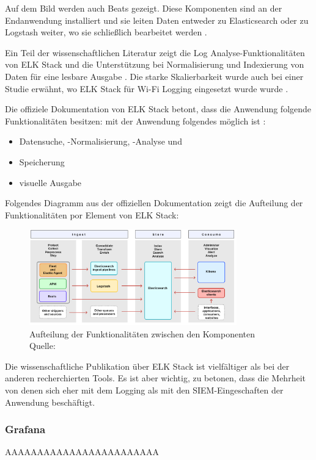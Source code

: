 Auf dem Bild werden auch Beats gezeigt. Diese Komponenten sind an der Endanwendung installiert und sie leiten Daten entweder zu Elasticsearch oder zu Logstash weiter, wo sie schließlich bearbeitet werden \citep{Jain_LMELK}. 

Ein Teil der wissenschaftlichen Literatur zeigt die Log Analyse-Funktionalitäten von ELK Stack und die Unterstützung bei Normalisierung und Indexierung von Daten für eine lesbare Ausgabe \citep{Advani_elkstakc}. Die starke Skalierbarkeit wurde auch bei einer Studie erwähnt, wo ELK Stack für Wi-Fi Logging eingesetzt wurde wurde \citep{Wang_elkwifi}.

Die offiziele Dokumentation von ELK Stack betont, dass die Anwendung folgende Funktionalitäten besitzen:  mit der Anwendung folgendes möglich ist \citep{elastic_docs}:

\begin{itemize}[noitemsep]
   \item Datensuche, -Normalisierung, -Analyse und 
   \item Speicherung
   \item visuelle Ausgabe
\end{itemize}

Folgendes Diagramm aus der offiziellen Dokumentation zeigt die Aufteilung der Funktionalitäten por Element von ELK Stack:

\begin{figure}[H]
   \centering
   \includegraphics[width=0.8\textwidth]{assets/2_p9.png}
   \caption{Aufteilung der Funktionalitäten zwischen den Komponenten\\Quelle: \citep{elastic_docs}}
   \centering
\end{figure}

Die wissenschaftliche Publikation über ELK Stack ist vielfältiger als bei der anderen recherchierten Tools. Es ist aber wichtig, zu betonen, dass die Mehrheit von denen sich eher mit dem Logging als mit den \gls{SIEM}-Eingeschaften der Anwendung beschäftigt.

\newpage
\subsubsection{Grafana}
AAAAAAAAAAAAAAAAAAAAAAAA


